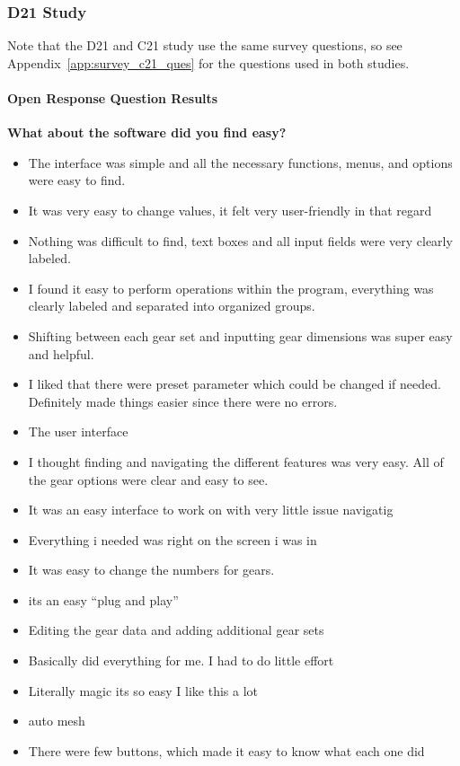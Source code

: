 \subsubsection{D21 Study}
Note that the D21 and C21 study use the same survey questions, so see Appendix~\ref{app:survey_c21_ques} for the questions used in both studies.

\paragraph{Open Response Question Results}

\noindent\textbf{What about the software did you find easy?}
\begin{itemize}
    \item The interface was simple and all the necessary functions, menus, and options were easy to find.
\item It was very easy to change values, it felt very user-friendly in that regard
\item Nothing was difficult to find, text boxes and all input fields were very clearly labeled.
\item I found it easy to perform operations within the program, everything was clearly labeled and separated into organized groups.
\item Shifting between each gear set and inputting gear dimensions was super easy and helpful.
\item I liked that there were preset parameter which could be changed if needed. Definitely made things easier since there were no errors. 
\item The user interface
\item I thought finding and navigating the different features was very easy. All of the gear options were clear and easy to see.
\item It was an easy interface to work on with very little issue navigatig
\item Everything i needed was right on the screen i was in
\item It was easy to change the numbers for gears.
\item its an easy ``plug and play''
\item Editing the gear data and adding additional gear sets
\item Basically did everything for me. I had to do little effort 
\item Literally magic its so easy I like this a lot
\item auto mesh
\item There were few buttons, which made it easy to know what each one did

\end{itemize}
